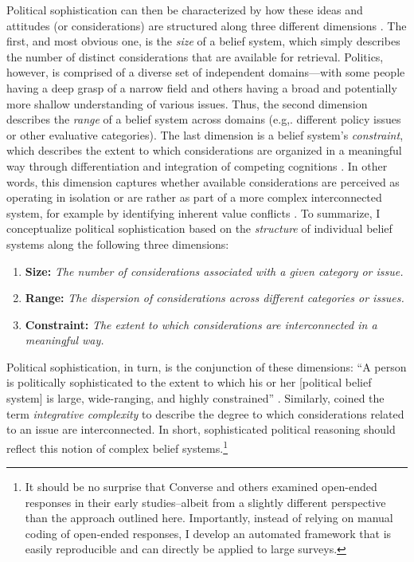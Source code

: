 Political sophistication can then be characterized by how these ideas and attitudes (or considerations) are structured along three different dimensions \citep{luskin1987measuring}. The first, and most obvious one, is the \textit{size} of a belief system, which simply describes the number of distinct considerations that are available for retrieval. Politics, however, is comprised of a diverse set of independent domains---with some people having a deep grasp of a narrow field and others having a broad and potentially more shallow understanding of various issues. Thus, the second dimension describes the \textit{range} of a belief system across domains (e.g,. different policy issues or other evaluative categories). The last dimension is a belief system's \textit{constraint}, which describes the extent to which considerations are organized in a meaningful way through differentiation and integration of competing cognitions \citep{luskin1987measuring}. In other words, this dimension captures whether available considerations are perceived as operating in isolation or are rather as part of a more complex interconnected system, for example by identifying inherent value conflicts \citep{tetlock1983cognitive,tetlock1993cognitive}. To summarize, I conceptualize political sophistication based on the \textit{structure} of individual belief systems along the following three dimensions:

\begin{enumerate}
	\item \textbf{Size:} \textit{The number of considerations associated with a given category or issue.}
	\item \textbf{Range:} \textit{The dispersion of considerations across different categories or issues.}
	\item \textbf{Constraint:} \textit{The extent to which considerations are interconnected in a meaningful way.}
\end{enumerate}

Political sophistication, in turn, is the conjunction of these dimensions: ``A person is politically sophisticated to the extent to which his or her [political belief system] is large, wide-ranging, and highly constrained'' \citep[860]{luskin1987measuring}. Similarly, \citet{tetlock1983cognitive,tetlock1993cognitive} coined the term \textsl{integrative complexity} to describe the degree to which considerations related to an issue are interconnected. In short, sophisticated political reasoning should reflect this notion of complex belief systems.\footnote{It should be no surprise that Converse and others examined open-ended responses in their early studies--albeit from a slightly different perspective than the approach outlined here. Importantly, instead of relying on manual coding of open-ended responses, I develop an automated framework that is easily reproducible and can directly be applied to large surveys.}


